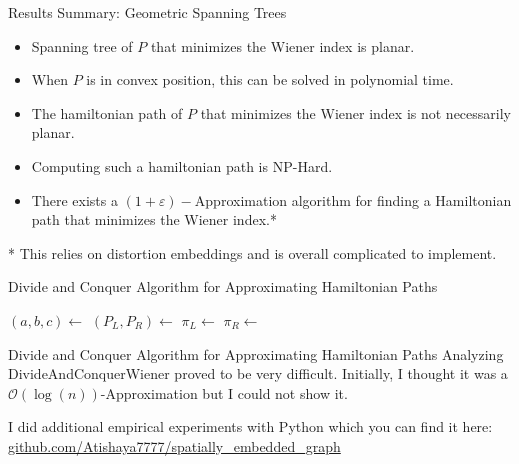 \documentclass[11pt]{beamer}
\begin{document}
\begin{frame}{Results Summary: Geometric Spanning Trees}
	\begin{itemize}
		\item Spanning tree of $P$ that minimizes the Wiener index is planar.
		      \pause
		\item When $P$ is in convex position, this can be solved in polynomial time.
		      \pause
		\item The hamiltonian path of $P$ that minimizes the Wiener index is not necessarily planar.
		      \pause
		\item Computing such a hamiltonian path is NP-Hard.
		      \pause
		\item There exists a $(1 + \varepsilon)-$Approximation algorithm for finding a Hamiltonian path that minimizes the Wiener index.*
	\end{itemize}

	* This relies on distortion embeddings and is overall complicated to implement.
\end{frame}

\begin{frame}{Divide and Conquer Algorithm for Approximating Hamiltonian Paths}
	\begin{algorithm}[H]
		\caption{DivideAndConquerWiener($P$)}
		\begin{algorithmic}[1]
			\State \Return {}
			\EndIf
			\State $(a, b, c) \gets$ 
			\State $(P_L, P_R) \gets$ 
			\State $\pi_L \gets$ 
			\State $\pi_R \gets$ 
			\State \Return {}
			\EndProcedure
		\end{algorithmic}
	\end{algorithm}
\end{frame}

\begin{frame}{Divide and Conquer Algorithm for Approximating Hamiltonian Paths}
	Analyzing DivideAndConquerWiener proved to be very difficult. Initially, I thought it was a $\mathcal{O}(\log(n))$-Approximation but I could not show it.

	I did additional empirical experiments with Python which you can find it here: \href{https://github.com/Atishaya7777/spatially_embedded_graph/tree/main/scripts}{github.com/Atishaya7777/spatially\_embedded\_graph}
\end{frame}
\end{document}
